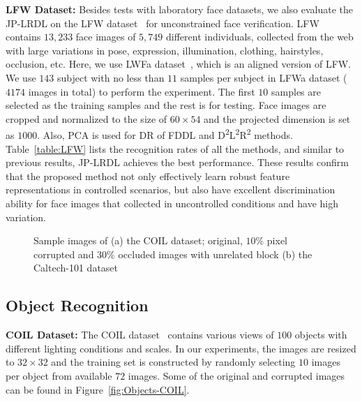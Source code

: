 \documentclass[journal]{IEEEtran}
\begin{document}
\vspace{1em}
\textbf{LFW Dataset:} Besides tests with laboratory face datasets, we also evaluate the JP-LRDL on the LFW dataset~\cite{LFW} for unconstrained face verification. LFW contains $13,233$ face images of $5,749$ different individuals, collected from the web with large variations in pose, expression, illumination, clothing, hairstyles, occlusion, etc. Here, we use LWFa dataset~\cite{LFW-a}, which is an aligned version of LFW. We use $143$ subject with no less than $11$ samples per subject in LFWa dataset ($4174$ images in total) to perform the experiment. The first $10$ samples are selected as the training samples and the rest is for testing. Face images are cropped and normalized to the size of $60 \times 54$ and the projected dimension is set as $1000$. Also, PCA is used for DR of FDDL and D\textsuperscript{2}L\textsuperscript{2}R\textsuperscript{2} methods. Table~\ref{table:LFW} lists the recognition rates of all the methods, and similar to previous results, JP-LRDL achieves the best performance. These results confirm that the proposed method not only effectively learn robust feature representations in controlled scenarios, but also have excellent discrimination ability for face images that collected in uncontrolled conditions and have high variation.
\begin{figure}[t]
\centering
{}  
\hspace{2pt}
\caption{Sample images of (a) the COIL dataset; original, $10\%$ pixel corrupted and 30\% occluded images with unrelated block (b) the Caltech-101 dataset}
\vspace{-1.5em}
\end{figure} 
\subsection{Object Recognition}
\textbf{COIL Dataset:} The COIL dataset~\cite{COIL} contains various views of $100$ objects with different lighting conditions and scales. In our experiments, the images are resized to $32 \times 32$ and the training set is constructed by randomly selecting $10$ images per object from available $72$ images. Some of the original and corrupted images can be found in Figure~\ref{fig:Objects-COIL}.
\end{document}
